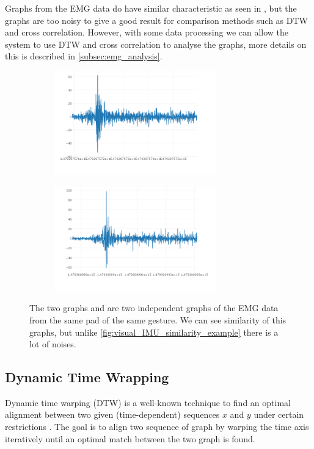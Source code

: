 Graphs from the EMG data do have similar characteristic as seen in , but the graphs are too noisy to give a good result for comparison methods such as DTW and cross correlation. However, with some data processing we can allow the system to use DTW and cross correlation to analyse the graphs, more details on this is described in \cref{subsec:emg_analysis}.  
\begin{figure}[!ht]
    \centering
    \begin{subfigure}{.5\textwidth}
        \centering
        \includegraphics[height=4.5cm]{content/05-Methodology/images/eat-emg8-1.png}
        \caption{}
        \label{fig:eat_emg8_1}
    \end{subfigure}%
    \begin{subfigure}{.5\textwidth}
        \centering
        \includegraphics[height=4.5cm]{content/05-Methodology/images/eat-emg8-2.png}
        \caption{}
        \label{fig:eat_emg8_2}
    \end{subfigure}
    \caption[Visual similarity of two EMG-graphs]{The two graphs  and  are two independent graphs of the EMG data from the same pad of the same gesture. We can see similarity of this graphs, but unlike \cref{fig:visual_IMU_similarity_example} there is a lot of noises.}
    \label{fig:visual_EMG_similarity_example}
\end{figure}

\subsection{Dynamic Time Wrapping}
\label{subsec:dtw}
Dynamic time warping (DTW) is a well-known technique to find an optimal alignment between two given (time-dependent) sequences $x$ and $y$ under certain restrictions \cite{muller2007dynamic}. The goal is to align two sequence of graph by warping the time axis iteratively until an optimal match between the two graph is found.

